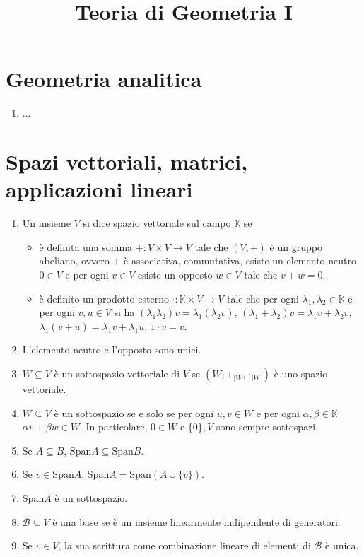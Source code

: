 \documentclass[a4paper,11pt]{article}
\title{Teoria di Geometria I}
\newcommand{\Span}{\mathrm{Span}}					%
\newcommand{\base}[1]{\mathcal{#1}}				%
\begin{document}
	\maketitle
\section{Geometria analitica}
\begin{enumerate}
	\item ...
\end{enumerate}
\section{Spazi vettoriali, matrici, applicazioni lineari}
\begin{enumerate}[resume]
	\item Un insieme $V$ si dice spazio vettoriale sul campo $\mathbb{K}$ se
	\begin{itemize}
		\item è definita una somma $+\colon V\times V\to V$ tale che $(V,+)$ è un gruppo abeliano, ovvero $+$ è associativa, commutativa, esiste un elemento neutro $0\in V$ e per ogni $v\in V$ esiste un opposto $w\in V$ tale che $v+w=0$.
		\item è definito un prodotto esterno $\cdot\colon\mathbb{K}\times V\to V$ tale che per ogni $\lambda_1,\lambda_2\in\mathbb{K}$ e per ogni $v,u\in V$ si ha $(\lambda_1\lambda_2)v=\lambda_1(\lambda_2v)$, $(\lambda_1+\lambda_2)v=\lambda_1v+\lambda_2v$, $\lambda_1(v+u)=\lambda_1v+\lambda_1u$, $1\cdot v=v$.
	\end{itemize}
	\item L'elemento neutro e l'opposto sono unici.
	\item $W\subseteq V$ è un sottospazio vettoriale di $V$ se $(W, +_{|W}, \cdot_{|W})$ è uno spazio vettoriale.
	\item $W\subseteq V$ è un sottospazio se e solo se per ogni $u,v\in W$ e per ogni $\alpha,\beta\in\mathbb{K}$ $\alpha v+\beta w\in W$. In particolare, $0\in W$ e $\{0\}, V$ sono sempre sottospazi.
	\item Se $A\subseteq B$, $\Span A\subseteq \Span B$.
	\item Se $v\in\Span A$, $\Span A=\Span (A\cup\{v\})$.
	\item $\Span A$ è un sottospazio.
	\item $\base{B}\subseteq V$ è una base se è un insieme linearmente indipendente di generatori.
	\item Se $v\in V$, la sua scrittura come combinazione lineare di elementi di $\base{B}$ è unica.

\end{enumerate}
\end{document}
